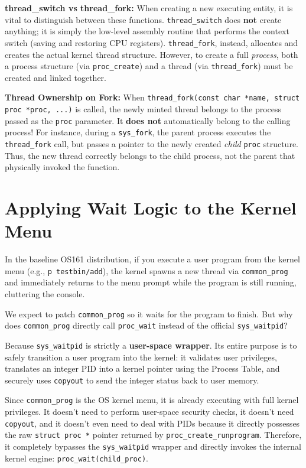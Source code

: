 \begin{tcolorbox}[colback=blue!5!white,colframe=blue!75!black,title=Exam Insight: Process vs Thread Creation (e.g. Q4 2023-06-20)]
\textbf{thread\_switch vs thread\_fork:} When creating a new executing entity, it is vital to distinguish between these functions. \texttt{thread\_switch} does \textbf{not} create anything; it is simply the low-level assembly routine that performs the context switch (saving and restoring CPU registers). \texttt{thread\_fork}, instead, allocates and creates the actual kernel thread structure. However, to create a full \textit{process}, both a process structure (via \texttt{proc\_create}) and a thread (via \texttt{thread\_fork}) must be created and linked together.

\textbf{Thread Ownership on Fork:} When \texttt{thread\_fork(const char *name, struct proc *proc, ...)} is called, the newly minted thread belongs to the process passed as the \texttt{proc} parameter. It \textbf{does not} automatically belong to the calling process! For instance, during a \texttt{sys\_fork}, the parent process executes the \texttt{thread\_fork} call, but passes a pointer to the newly created \textit{child} \texttt{proc} structure. Thus, the new thread correctly belongs to the child process, not the parent that physically invoked the function.
\end{tcolorbox}

\section{Applying Wait Logic to the Kernel Menu}
In the baseline OS161 distribution, if you execute a user program from the kernel menu (e.g., \texttt{p testbin/add}), the kernel spawns a new thread via \texttt{common\_prog} and immediately returns to the menu prompt while the program is still running, cluttering the console.

We expect to patch \texttt{common\_prog} so it waits for the program to finish. But why does \texttt{common\_prog} directly call \texttt{proc\_wait} instead of the official \texttt{sys\_waitpid}? 

Because \texttt{sys\_waitpid} is strictly a \textbf{user-space wrapper}. Its entire purpose is to safely transition a user program into the kernel: it validates user privileges, translates an integer PID into a kernel pointer using the Process Table, and securely uses \texttt{copyout} to send the integer status back to user memory. 

Since \texttt{common\_prog} is the OS kernel menu, it is already executing with full kernel privileges. It doesn't need to perform user-space security checks, it doesn't need \texttt{copyout}, and it doesn't even need to deal with PIDs because it directly possesses the raw \texttt{struct proc *} pointer returned by \texttt{proc\_create\_runprogram}. Therefore, it completely bypasses the \texttt{sys\_waitpid} wrapper and directly invokes the internal kernel engine: \texttt{proc\_wait(child\_proc)}.

